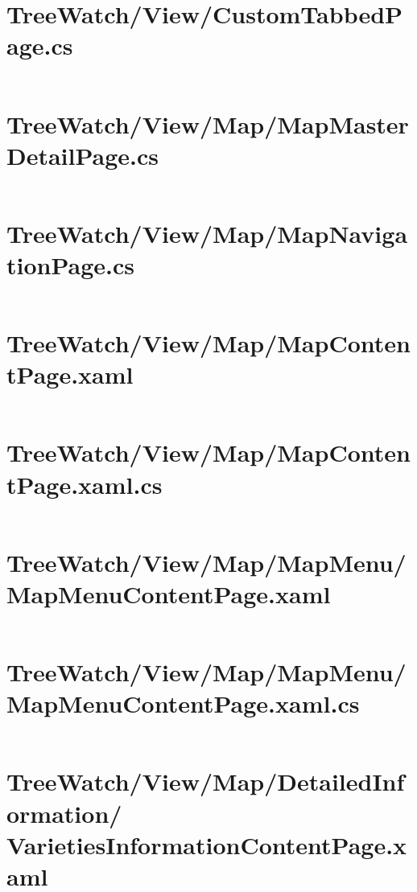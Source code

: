 \documentclass[12pt]{article}
\begin{document}
\tableofcontents
\clearpage




\section{TreeWatch/View/CustomTabbedPage.cs}
\inputminted[linenos,firstline=22]{csharp}{../../../src/TreeWatch/View/CustomTabbedPage.cs}
\section{TreeWatch/View/Map/MapMasterDetailPage.cs}
\inputminted[linenos,firstline=22]{csharp}{../../../src/TreeWatch/View/Map/MapMasterDetailPage.cs}
\section{TreeWatch/View/Map/MapNavigationPage.cs}
\inputminted[linenos,firstline=22]{csharp}{../../../src/TreeWatch/View/Map/MapNavigationPage.cs}
\section{TreeWatch/View/Map/MapContentPage.xaml}
\inputminted[linenos]{xml}{../../../src/TreeWatch/View/Map/MapContentPage.xaml}
\section{TreeWatch/View/Map/MapContentPage.xaml.cs}
\inputminted[linenos,firstline=22]{csharp}{../../../src/TreeWatch/View/Map/MapContentPage.xaml.cs}
\section{TreeWatch/View/Map/MapMenu/ MapMenuContentPage.xaml}
\inputminted[linenos]{xml}{../../../src/TreeWatch/View/Map/MapMenu/MapMenuContentPage.xaml}
\section{TreeWatch/View/Map/MapMenu/ MapMenuContentPage.xaml.cs}
\inputminted[linenos,firstline=22]{csharp}{../../../src/TreeWatch/View/Map/MapMenu/MapMenuContentPage.xaml.cs}
\section{TreeWatch/View/Map/DetailedInformation/ VarietiesInformationContentPage.xaml}
\inputminted[linenos]{xml}{../../../src/TreeWatch/View/Map/DetailedInformation/VarietiesInformationContentPage.xaml}
\end{document}
